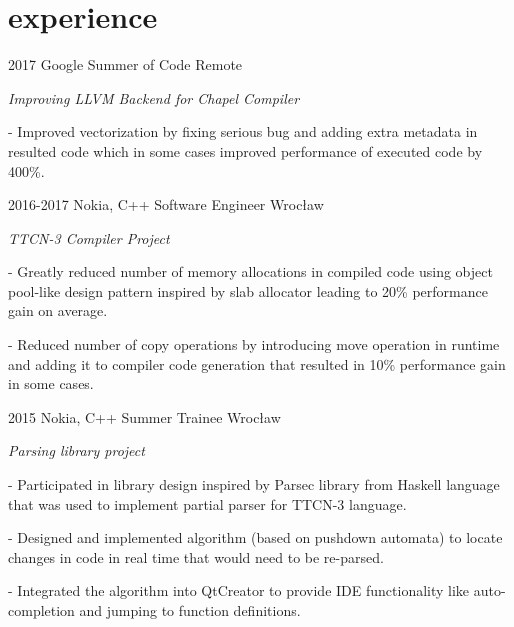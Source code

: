 \documentclass[]{twentysecondcv}
\begin{document}

\section{experience}

\begin{twenty}
  \twentyitem
    {2017}
    {Google Summer of Code}
    {Remote}
    {
    \emph{Improving LLVM Backend for Chapel Compiler}
    
    -  Improved vectorization by fixing serious bug and adding extra metadata in resulted code which in some cases improved performance of executed code by 400\%. 
    
    }
  \twentyitem
    {2016-2017}
    {Nokia, C++ Software Engineer}
    {Wrocław}
    {
    \emph{TTCN-3 Compiler Project}
    
     - Greatly reduced number of memory allocations in compiled code using object pool-like design pattern inspired by slab allocator leading to 20\% performance gain on average.
     
     - Reduced number of copy operations by introducing move operation in runtime and adding it to compiler code generation that resulted in 10\% performance gain in some cases. }
     
\twentyitem
    {2015}
    {Nokia, C++ Summer Trainee}
    {Wrocław}
    {
    \emph{Parsing library project}
    
    - Participated in library design inspired by Parsec library from Haskell language that was used to implement partial parser for TTCN-3 language.
    
    - Designed and implemented algorithm (based on pushdown automata) to locate changes in code in real time that would need to be re-parsed.
    
    - Integrated the algorithm into QtCreator to provide IDE functionality like auto-completion and jumping to function definitions.
    
    }

\end{twenty}
\end{document}
